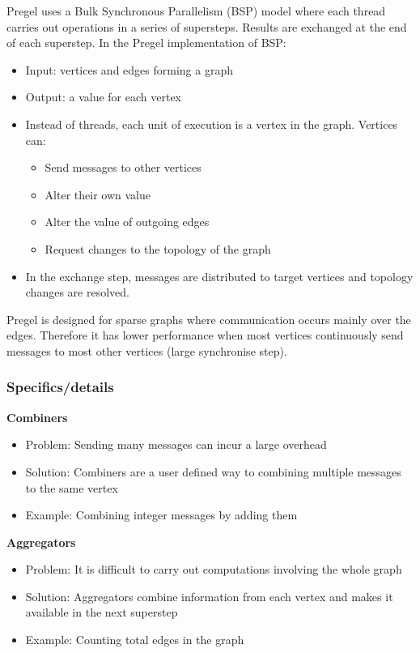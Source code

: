 \documentclass{sty/SizheArticle}
\begin{document}

Pregel uses a Bulk Synchronous Parallelism (BSP) model where each thread carries
out operations in a series of supersteps. Results are exchanged at the end
of each superstep. In the Pregel implementation of BSP:
\begin{itemize}
\item Input: vertices and edges forming a graph
\item Output: a value for each vertex
\item Instead of threads, each unit of execution is a vertex in the graph.
Vertices can:
	\begin{itemize}
	\item Send messages to other vertices
	\item Alter their own value
	\item Alter the value of outgoing edges
	\item Request changes to the topology of the graph
	\end{itemize}
\item In the exchange step, messages are distributed to target vertices
and topology changes are resolved. 
\end{itemize}

Pregel is designed for sparse graphs where communication occurs mainly over
the edges. Therefore it has lower performance when most vertices
continuously send messages to most other vertices (large synchronise step).

\subsubsection{Specifics/details}
\textbf{Combiners} \\
\begin{itemize}
\item Problem: Sending many messages can incur a large overhead
\item Solution: Combiners are a user defined way to combining multiple messages
to the same vertex
\item Example: Combining integer messages by adding them
\end{itemize}

\textbf{Aggregators} \\
\begin{itemize}
\item Problem: It is difficult to carry out computations involving the whole graph
\item Solution: Aggregators combine information from each vertex and makes
it available in the next superstep
\item Example: Counting total edges in the graph
\end{itemize}
\end{document}
